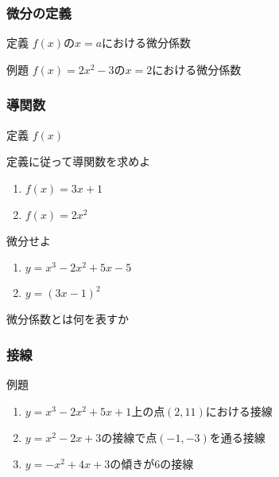 \documentclass[10pt,dvipdfmx]{jsarticle}
\begin{document}
\subsubsection*{微分の定義}
定義 $f(x)のx=aにおける微分係数$
\vspace{8mm}
\begin{itembox}[l]{例題}
  $f(x)=2x^2-3$の$x=2$における微分係数
\end{itembox}

\subsubsection*{導関数}
定義 $f(x)$
\vspace{8mm}
\begin{itembox}[l]{定義に従って導関数を求めよ}
  \begin{multicols}{2}
    \begin{large}
      \begin{enumerate}
        \item $f(x)=3x+1$
        \item $f(x)=2x^2$
      \end{enumerate}
    \end{large}
  \end{multicols}
\end{itembox}

\begin{itembox}[l]{微分せよ}
  \begin{large}
    \begin{multicols}{2}
      \begin{enumerate}
        \item $y=x^3-2x^2+5x-5$
        \item $y=(3x-1)^2$
      \end{enumerate}
    \end{multicols}
  \end{large}
\end{itembox}

\begin{itembox}[l]{微分係数とは何を表すか}
  \vspace{8mm}
\end{itembox}

\subsubsection*{接線}
\begin{itembox}[l]{例題}
  \begin{enumerate}
    \item $y=x^3-2x^2+5x+1上の点(2,11)における接線$\vspace{5mm}
    \item $y=x^2-2x+3の接線で点(-1,-3)を通る接線$\vspace{5mm}
    \item $y=-x^2+4x+3の傾きが6の接線$\vspace{5mm}
  \end{enumerate}
\end{itembox}
\end{document}
